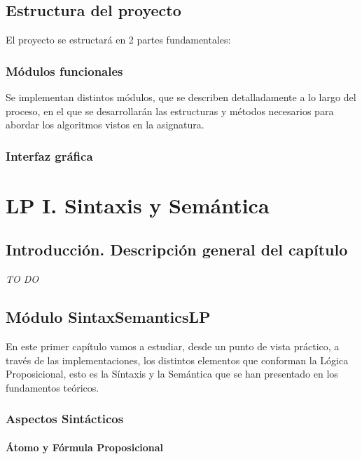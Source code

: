 \documentclass[a4paper]{report}
\begin{document}
\section{Estructura del proyecto}

El proyecto se estructará en 2 partes fundamentales:

\subsection{Módulos funcionales}

Se implementan distintos módulos, que se describen detalladamente a lo largo del proceso, en el que se desarrollarán las estructuras y métodos necesarios para abordar los algoritmos vistos en la asignatura.

\subsection{Interfaz gráfica}

\chapter{LP I. Sintaxis y Semántica}
\renewcommand{\mtctitle}{}
\mtcskip
\minitoc
\newpage
\section{Introducción. Descripción general del capítulo}

\textit{TO DO}

\newpage
\section{Módulo SintaxSemanticsLP}

En este primer capítulo vamos a estudiar, desde un punto de vista práctico, a través de las implementaciones, los distintos elementos que conforman la Lógica Proposicional, esto es la Síntaxis y la Semántica que se han presentado en los fundamentos teóricos.

\subsection{Aspectos Sintácticos}

\subsubsection{Átomo y Fórmula Proposicional}
\end{document}
